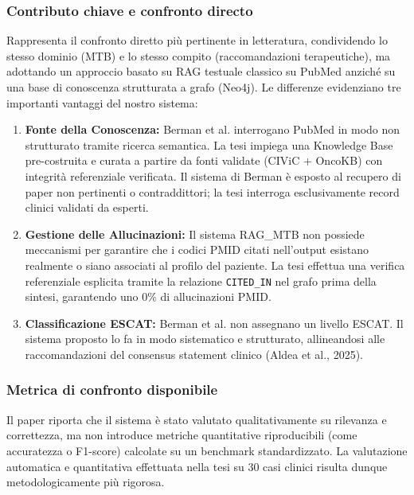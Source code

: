 \documentclass[11pt,a4paper]{article}
\newcommand{\code}[1]{\texttt{\small #1}}
\begin{document}
\subsubsection*{Contributo chiave e confronto directo}
Rappresenta il confronto diretto più pertinente in letteratura, condividendo lo stesso dominio (MTB) e lo stesso compito (raccomandazioni terapeutiche), ma adottando un approccio basato su RAG testuale classico su PubMed anziché su una base di conoscenza strutturata a grafo (Neo4j). Le differenze evidenziano tre importanti vantaggi del nostro sistema:
\begin{enumerate}
  \item \textbf{Fonte della Conoscenza:} Berman et al. interrogano PubMed in modo non strutturato tramite ricerca semantica. La tesi impiega una Knowledge Base pre-costruita e curata a partire da fonti validate (CIViC + OncoKB) con integrità referenziale verificata. Il sistema di Berman è esposto al recupero di paper non pertinenti o contraddittori; la tesi interroga esclusivamente record clinici validati da esperti.
  \item \textbf{Gestione delle Allucinazioni:} Il sistema RAG\_MTB non possiede meccanismi per garantire che i codici PMID citati nell'output esistano realmente o siano associati al profilo del paziente. La tesi effettua una verifica referenziale esplicita tramite la relazione \code{CITED\_IN} nel grafo prima della sintesi, garantendo uno $0\%$ di allucinazioni PMID.
  \item \textbf{Classificazione ESCAT:} Berman et al. non assegnano un livello ESCAT. Il sistema proposto lo fa in modo sistematico e strutturato, allineandosi alle raccomandazioni del consensus statement clinico (Aldea et al., 2025).
\end{enumerate}

\subsubsection*{Metrica di confronto disponibile}
Il paper riporta che il sistema è stato valutato qualitativamente su rilevanza e correttezza, ma non introduce metriche quantitative riproducibili (come accuratezza o F1-score) calcolate su un benchmark standardizzato. La valutazione automatica e quantitativa effettuata nella tesi su 30 casi clinici risulta dunque metodologicamente più rigorosa.
\end{document}
